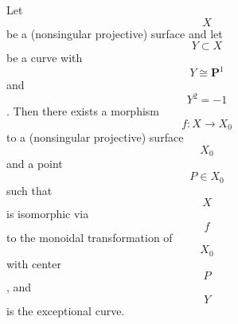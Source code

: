 Let $$X$$ be a (nonsingular projective) surface and let $$Y \subset X$$ be a curve with $$Y \cong \mathbf{P}^1$$ and $$Y^2 = -1$$. Then there exists a morphism $$f: X \to X_0$$ to a (nonsingular projective) surface $$X_0$$ and a point $$P \in X_0$$ such that $$X$$ is isomorphic via $$f$$ to the monoidal transformation of $$X_0$$ with center $$P$$, and $$Y$$ is the exceptional curve.
